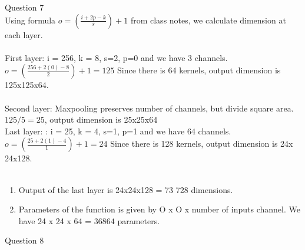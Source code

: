 \documentclass{article}
\begin{document}
\vspace{1cm}
 Question 7\\

    Using formula $ o = (\frac{i + 2p - k}{s}) +1$ from class notes, we calculate dimension at each layer.\\ \\

    First layer: i = 256, k = 8, s=2, p=0 and we have 3 channels. $o =(\frac{256 +2(0) - 8}{2}) + 1 =  125$ Since there is 64 kernels, output dimension is 125x125x64.\\ \\
    Second layer: Maxpooling preserves number of channels, but divide square area. $125/5 = 25$, output dimension is 25x25x64\\
   Last layer: : i = 25, k = 4, s=1, p=1 and we have 64 channels. $o =(\frac{25 +2(1) - 4}{1}) + 1 =  24$ Since there is 128 kernels, output dimension is  24x 24x128.\\ \\
  \begin{enumerate}
	\item
	Output of the last layer is 24x24x128 = 73 728 dimensions.\\

	\item
	Parameters of the function is given by O x O x number of inputs channel. We have 24 x 24 x 64 = $36 864$ parameters.
\end{enumerate}

\vspace{1cm}
 Question 8\\
	
\end{document}
